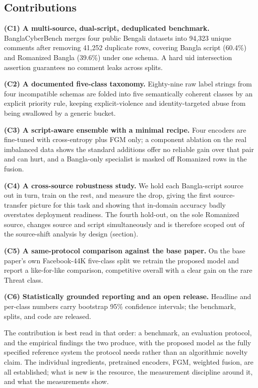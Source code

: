 \documentclass[11pt,a4paper]{article}
\def\cref#1{section}%
\def\texttt#1{#1}%
\def\emph#1{#1}%
\newcommand{\bench}{BanglaCyberBench}
\begin{document}
\subsection{Contributions}
\label{sec:contributions}

\textbf{(C1) A multi-source, dual-script, deduplicated benchmark.} \bench{} merges four public Bengali datasets into 94{,}323 unique comments after removing 41{,}252 duplicate rows, covering Bangla script (60.4\%) and Romanized Bangla (39.6\%) under one schema. A hard \texttt{uid} intersection assertion guarantees no comment leaks across splits.

\textbf{(C2) A documented five-class taxonomy.} Eighty-nine raw label strings from four incompatible schemas are folded into five semantically coherent classes by an explicit priority rule, keeping explicit-violence and identity-targeted abuse from being swallowed by a generic bucket.

\textbf{(C3) A script-aware ensemble with a minimal recipe.} Four encoders are fine-tuned with cross-entropy plus FGM only; a component ablation on the real imbalanced data shows the standard additions offer no reliable gain over that pair and can hurt, and a Bangla-only specialist is masked off Romanized rows in the fusion.

\textbf{(C4) A cross-source robustness study.} We hold each Bangla-script source out in turn, train on the rest, and measure the drop, giving the first source-transfer picture for this task and showing that in-domain accuracy badly overstates deployment readiness. The fourth hold-out, on the sole Romanized source, changes source and script simultaneously and is therefore scoped out of the source-shift analysis by design (\cref{sec:splits}).

\textbf{(C5) A same-protocol comparison against the base paper.} On the base paper's own Facebook-44K five-class split we retrain the proposed model and report a like-for-like comparison, competitive overall with a clear gain on the rare \emph{Threat} class.

\textbf{(C6) Statistically grounded reporting and an open release.} Headline and per-class numbers carry bootstrap 95\% confidence intervals; the benchmark, splits, and code are released.

The contribution is best read in that order: a benchmark, an evaluation protocol, and the empirical findings the two produce, with the proposed model as the fully specified reference system the protocol needs rather than an algorithmic novelty claim. The individual ingredients, pretrained encoders, FGM, weighted fusion, are all established; what is new is the resource, the measurement discipline around it, and what the measurements show.
\end{document}
